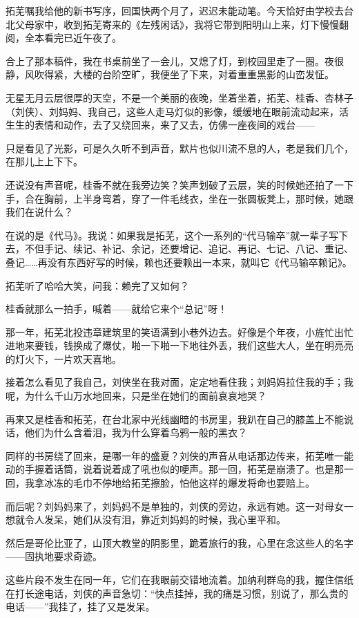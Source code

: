 \par 拓芜嘱我给他的新书写序，回国快两个月了，迟迟未能动笔。今天恰好由学校去台北父母家中，收到拓芜寄来的《左残闲话》，我将它带到阳明山上来，灯下慢慢翻阅，全本看完已近午夜了。
\par 合上了那本稿件，我在书桌前坐了一会儿，又熄了灯，到校园里走了一圈。夜很静，风吹得紧，大楼的台阶空旷，我便坐了下来，对着重重黑影的山峦发怔。
\par 无星无月云层很厚的天空，不是一个美丽的夜晚，坐着坐着，拓芜、桂香、杏林子（刘侠）、刘妈妈、我自己，这些人走马灯似的影像，缓缓地在眼前流动起来，活生生的表情和动作，去了又绕回来，来了又去，仿佛一座夜间的戏台——
\par 只是看见了光影，可是久久听不到声音，默片也似川流不息的人，老是我们几个，在那儿上上下下。
\par 还说没有声音呢，桂香不就在我旁边笑？笑声划破了云层，笑的时候她还拍了一下手，合在胸前，上半身弯着，穿了一件毛线衣，坐在一张圆板凳上，那时候，她跟我们在说什么？
\par 在说的是《代马》。我说：如果我是拓芜，这个一系列的“代马输卒”就一辈子写下去，不但手记、续记、补记、余记，还要增记、追记、再记、七记、八记、重记、叠记……再没有东西好写的时候，赖也还要赖出一本来，就叫它《代马输卒赖记》。
\par 拓芜听了哈哈大笑，问我：赖完了又如何？
\par 桂香就那么一拍手，喊着——就给它来个“总记”呀！
\par 那一年，拓芜北投违章建筑里的笑语满到小巷外边去。好像是个年夜，小旌忙出忙进地来要钱，钱换成了爆仗，啪一下啪一下地往外丢，我们这些大人，坐在明亮亮的灯火下，一片欢天喜地。
\par 接着怎么看见了我自己，刘侠坐在我对面，定定地看住我；刘妈妈拉住我的手；我呢，为什么千山万水地回来，只是坐在她们的面前哀哀地哭？
\par 再来又是桂香和拓芜，在台北家中光线幽暗的书房里，我趴在自己的膝盖上不能说话，他们为什么含着泪，我为什么穿着乌鸦一般的黑衣？
\par 同样的书房绕了回来，是哪一年的盛夏？刘侠的声音从电话那边传来，拓芜唯一能动的手握着话筒，说着说着成了吼也似的哽声。那一回，拓芜是崩溃了。也是那一回，我拿冰冻的毛巾不停地给拓芜擦脸，怕他这样的爆发将命也要赔上。
\par 而后呢？刘妈妈来了，刘妈妈不是单独的，刘侠的旁边，永远有她。这一对母女一想就令人发呆，她们从没有泪，靠近刘妈妈的时候，我心里平和。
\par 然后是哥伦比亚了，山顶大教堂的阴影里，跪着旅行的我，心里在念这些人的名字——固执地要求奇迹。
\par 这些片段不发生在同一年，它们在我眼前交错地流着。加纳利群岛的我，握住信纸在打长途电话，刘侠的声音急切：“快点挂掉，我的痛是习惯，别说了，那么贵的电话——”我挂了，挂了又是发呆。
